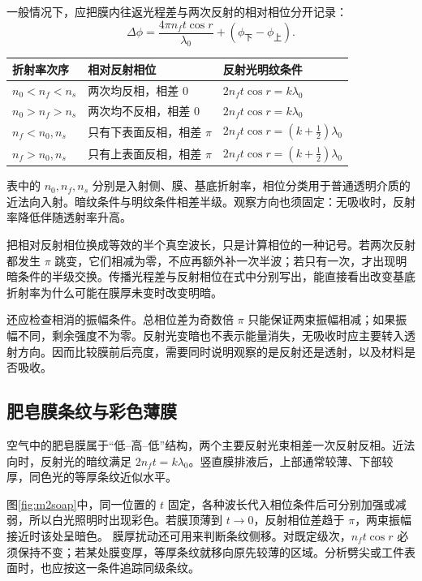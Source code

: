 一般情况下，应把膜内往返光程差与两次反射的相对相位分开记录：
\[
 \Delta\phi=\frac{4\pi n_ft\cos r}{\lambda_0}
 +(\phi_{\text{下}}-\phi_{\text{上}}).
\]
\begin{center}\small
\begin{tabular}{@{}p{3.2cm}p{3.2cm}p{4.3cm}@{}}
\toprule
折射率次序 & 相对反射相位 & 反射光明纹条件\\
\midrule
\(n_0<n_f<n_s\) & 两次均反相，相差 \(0\) & \(2n_ft\cos r=k\lambda_0\)\\
\(n_0>n_f>n_s\) & 两次均不反相，相差 \(0\) & \(2n_ft\cos r=k\lambda_0\)\\
\(n_f<n_0,n_s\) & 只有下表面反相，相差 \(\pi\) & \(2n_ft\cos r=(k+\tfrac12)\lambda_0\)\\
\(n_f>n_0,n_s\) & 只有上表面反相，相差 \(\pi\) & \(2n_ft\cos r=(k+\tfrac12)\lambda_0\)\\
\bottomrule
\end{tabular}
\end{center}
表中的 \(n_0,n_f,n_s\) 分别是入射侧、膜、基底折射率，相位分类用于普通透明介质的近法向入射。暗纹条件与明纹条件相差半级。观察方向也须固定：无吸收时，反射率降低伴随透射率升高。

把相对反射相位换成等效的半个真空波长，只是计算相位的一种记号。若两次反射都发生 $\pi$ 跳变，它们相减为零，不应再额外补一次半波；若只有一次，才出现明暗条件的半级交换。传播光程差与反射相位在式中分别写出，能直接看出改变基底折射率为什么可能在膜厚未变时改变明暗。

还应检查相消的振幅条件。总相位差为奇数倍 $\pi$ 只能保证两束振幅相减；如果振幅不同，剩余强度不为零。反射光变暗也不表示能量消失，无吸收时应主要转入透射方向。因而比较膜前后亮度，需要同时说明观察的是反射还是透射，以及材料是否吸收。

\subsection{肥皂膜条纹与彩色薄膜}

空气中的肥皂膜属于“低--高--低”结构，两个主要反射光束相差一次反射反相。近法向时，反射光的暗纹满足 \(2n_ft=k\lambda_0\)。竖直膜排液后，上部通常较薄、下部较厚，同色光的等厚条纹近似水平。

图\ref{fig:m2soap}中，同一位置的 \(t\) 固定，各种波长代入相位条件后可分别加强或减弱，所以白光照明时出现彩色。若膜顶薄到 \(t\to0\)，反射相位差趋于 \(\pi\)，两束振幅接近时该处呈暗色。
膜厚扰动还可用来判断条纹侧移。对既定级次，\(n_ft\cos r\) 必须保持不变；若某处膜变厚，等厚条纹就移向原先较薄的区域。分析劈尖或工件表面时，也应按这一条件追踪同级条纹。

